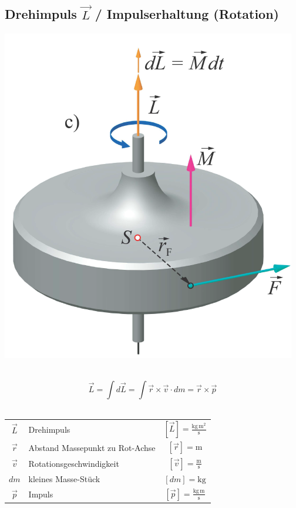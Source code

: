 	 
	\vfill\null
	\columnbreak
	 
	
	\subsection{Drehimpuls $\vec{L}$ / Impulserhaltung (Rotation)}
	\begin{minipage}{0.42\linewidth}
	\includegraphics[width=\linewidth]{Bilder/drehimpuls} \\
	\\
	\end{minipage}
	\hfill
	\begin{minipage}{0.56\linewidth}
	$$ \boxed{ \vec{L} = \int d \vec{L} = \int \vec{r} \times \vec{v} \cdot dm = \vec{r} \times \vec{p} }$$ \\
	\end{minipage}
	
	
	
	\begin{tabular}{c l c}
	$\vec{L}$ & Drehimpuls & $[\vec{L}] = \mathrm{\frac{kg \, m^2}{s}}$ \\
	$\vec{r}$ & Abstand Massepunkt zu Rot-Achse & $[\vec{r}] = \mathrm{m}$ \\
	$\vec{v}$ & Rotationsgeschwindigkeit & $[\vec{v}] = \mathrm{\frac{m}{s}}$ \\
	$dm$ & kleines Masse-Stück & $[dm] = \mathrm{kg}$ \\
	$\vec{p}$ & Impuls & $[\vec{p}] = \mathrm{\frac{kg \, m}{s}}$ \\
	\end{tabular}
	
